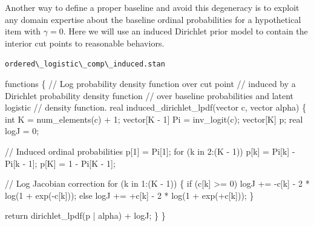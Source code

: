 \documentclass[
  letterpaper,
  DIV=11,
  numbers=noendperiod]{scrartcl}
\newenvironment{Shaded}{\begin{snugshade}}{\end{snugshade}}
\newcommand{\CommentTok}[1]{\textcolor[rgb]{0.37,0.37,0.37}{#1}}
\newcommand{\ControlFlowTok}[1]{\textcolor[rgb]{0.00,0.23,0.31}{#1}}
\newcommand{\DataTypeTok}[1]{\textcolor[rgb]{0.68,0.00,0.00}{#1}}
\newcommand{\DecValTok}[1]{\textcolor[rgb]{0.68,0.00,0.00}{#1}}
\newcommand{\KeywordTok}[1]{\textcolor[rgb]{0.00,0.23,0.31}{#1}}
\newcommand{\NormalTok}[1]{\textcolor[rgb]{0.00,0.23,0.31}{#1}}
\begin{document}
Another way to define a proper baseline and avoid this degeneracy is to
exploit any domain expertise about the baseline ordinal probabilities
for a hypothetical item with \(\gamma = 0\). Here we will use an induced
Dirichlet prior model to contain the interior cut points to reasonable
behaviors.

\begin{codelisting}

\caption{\texttt{ordered\textbackslash\_logistic\textbackslash\_comp\textbackslash\_induced.stan}}

\begin{Shaded}
\begin{Highlighting}[]
\KeywordTok{functions}\NormalTok{ \{}
  \CommentTok{// Log probability density function over cut point}
  \CommentTok{// induced by a Dirichlet probability density function}
  \CommentTok{// over baseline probabilities and latent logistic}
  \CommentTok{// density function.}
  \DataTypeTok{real}\NormalTok{ induced\_dirichlet\_lpdf(}\DataTypeTok{vector}\NormalTok{ c, }\DataTypeTok{vector}\NormalTok{ alpha) \{}
    \DataTypeTok{int}\NormalTok{ K = num\_elements(c) + }\DecValTok{1}\NormalTok{;}
    \DataTypeTok{vector}\NormalTok{[K {-} }\DecValTok{1}\NormalTok{] Pi = inv\_logit(c);}
    \DataTypeTok{vector}\NormalTok{[K] p;}
    \DataTypeTok{real}\NormalTok{ logJ = }\DecValTok{0}\NormalTok{;}

    \CommentTok{// Induced ordinal probabilities}
\NormalTok{    p[}\DecValTok{1}\NormalTok{] = Pi[}\DecValTok{1}\NormalTok{];}
    \ControlFlowTok{for}\NormalTok{ (k }\ControlFlowTok{in} \DecValTok{2}\NormalTok{:(K {-} }\DecValTok{1}\NormalTok{))}
\NormalTok{      p[k] = Pi[k] {-} Pi[k {-} }\DecValTok{1}\NormalTok{];}
\NormalTok{    p[K] = }\DecValTok{1}\NormalTok{ {-} Pi[K {-} }\DecValTok{1}\NormalTok{];}

    \CommentTok{// Log Jacobian correction}
    \ControlFlowTok{for}\NormalTok{ (k }\ControlFlowTok{in} \DecValTok{1}\NormalTok{:(K {-} }\DecValTok{1}\NormalTok{)) \{}
      \ControlFlowTok{if}\NormalTok{ (c[k] \textgreater{}= }\DecValTok{0}\NormalTok{)}
\NormalTok{        logJ += {-}c[k] {-} }\DecValTok{2}\NormalTok{ * log(}\DecValTok{1}\NormalTok{ + exp({-}c[k]));}
      \ControlFlowTok{else}
\NormalTok{        logJ += +c[k] {-} }\DecValTok{2}\NormalTok{ * log(}\DecValTok{1}\NormalTok{ + exp(+c[k]));}
\NormalTok{    \}}

    \ControlFlowTok{return}\NormalTok{ dirichlet\_lpdf(p | alpha) + logJ;}
\NormalTok{  \}}
\NormalTok{\}}


\end{Highlighting}
\end{Shaded}
\end{codelisting}
\end{document}
